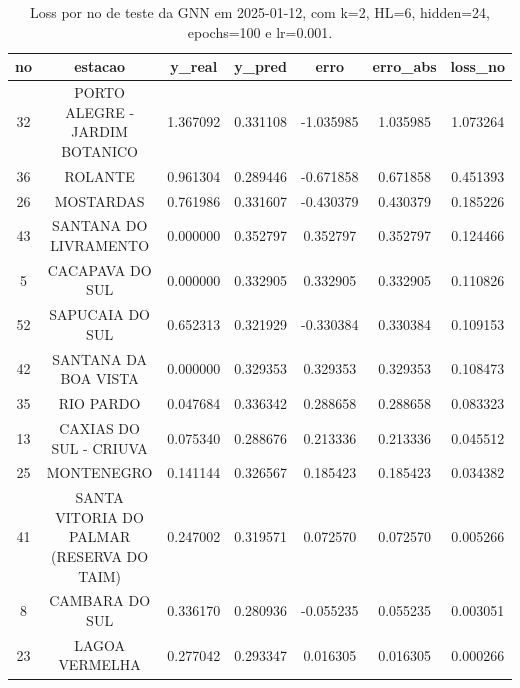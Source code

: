 \begin{table}[h]
\centering
\caption{Loss por no de teste da GNN em 2025-01-12, com k=2, HL=6, hidden=24, epochs=100 e lr=0.001.}
\label{tab:gnn_loss_k2_hl6_h24_e100_d20250112}
\begin{tabular}{ccccccc}
\toprule
no & estacao & y\_real & y\_pred & erro & erro\_abs & loss\_no \\
\midrule
32 & PORTO ALEGRE - JARDIM BOTANICO & 1.367092 & 0.331108 & -1.035985 & 1.035985 & 1.073264 \\
36 & ROLANTE & 0.961304 & 0.289446 & -0.671858 & 0.671858 & 0.451393 \\
26 & MOSTARDAS & 0.761986 & 0.331607 & -0.430379 & 0.430379 & 0.185226 \\
43 & SANTANA DO LIVRAMENTO & 0.000000 & 0.352797 & 0.352797 & 0.352797 & 0.124466 \\
5 & CACAPAVA DO SUL & 0.000000 & 0.332905 & 0.332905 & 0.332905 & 0.110826 \\
52 & SAPUCAIA DO SUL & 0.652313 & 0.321929 & -0.330384 & 0.330384 & 0.109153 \\
42 & SANTANA DA BOA VISTA & 0.000000 & 0.329353 & 0.329353 & 0.329353 & 0.108473 \\
35 & RIO PARDO & 0.047684 & 0.336342 & 0.288658 & 0.288658 & 0.083323 \\
13 & CAXIAS DO SUL - CRIUVA & 0.075340 & 0.288676 & 0.213336 & 0.213336 & 0.045512 \\
25 & MONTENEGRO & 0.141144 & 0.326567 & 0.185423 & 0.185423 & 0.034382 \\
41 & SANTA VITORIA DO PALMAR (RESERVA DO TAIM) & 0.247002 & 0.319571 & 0.072570 & 0.072570 & 0.005266 \\
8 & CAMBARA DO SUL & 0.336170 & 0.280936 & -0.055235 & 0.055235 & 0.003051 \\
23 & LAGOA VERMELHA & 0.277042 & 0.293347 & 0.016305 & 0.016305 & 0.000266 \\
\bottomrule
\end{tabular}
\end{table}
